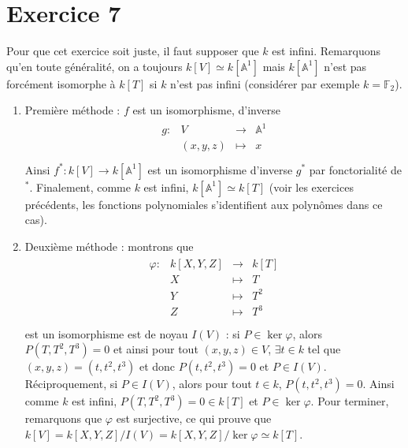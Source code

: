     \section{Exercice 7}
        Pour que cet exercice soit juste, il faut supposer que $k$ est infini. Remarquons qu'en toute généralité, on a toujours $k[V] \simeq k[\mathbb{A}^1]$ mais $k[\mathbb{A}^1]$ n'est pas forcément isomorphe à $k[T]$ si $k$ n'est pas infini (considérer par exemple $k = \mathbb{F}_2$).
        \begin{enumerate}
            \item Première méthode : $f$ est un isomorphisme, d'inverse
            \begin{align*}
                \begin{array}{cccc}
                    g : & V & \to & \mathbb{A}^1 \\
                    & (x,y,z) & \mapsto & x \\
                \end{array}
            \end{align*}
            Ainsi $f^* : k[V] \to k[\mathbb{A}^1]$ est un isomorphisme d'inverse $g^*$ par fonctorialité de $^*$. Finalement, comme $k$ est infini, $k[\mathbb{A}^1] \simeq k[T]$ (voir les exercices précédents, les fonctions polynomiales s'identifient aux polynômes dans ce cas).
            \item Deuxième méthode : montrons que
            \begin{align*}
                \begin{array}{cccc}
                    \varphi : & k[X,Y,Z] & \to & k[T] \\
                    & X & \mapsto & T \\
                    & Y & \mapsto & T^2 \\
                    & Z & \mapsto & T^3 \\
                \end{array}
            \end{align*}
            est un isomorphisme est de noyau $I(V)$ : si $P \in \ker \varphi$, alors $P(T,T^2,T^3) = 0$ et ainsi pour tout $(x,y,z) \in V$, $\exists t \in k$ tel que $(x,y,z) = (t,t^2,t^3)$ et donc $P(t,t^2,t^3) = 0$ et $P \in I(V)$. Réciproquement, si $P \in I(V)$, alors pour tout $t \in k$, $P(t, t^2, t^3) = 0$. Ainsi comme $k$ est infini, $P(T,T^2,T^3) = 0 \in k[T]$ et $P \in \ker \varphi$. Pour terminer, remarquons que $\varphi$ est surjective, ce qui prouve que $k[V] = k[X,Y,Z]/I(V) = k[X,Y,Z]/\ker \varphi \simeq k[T]$.
        \end{enumerate}


